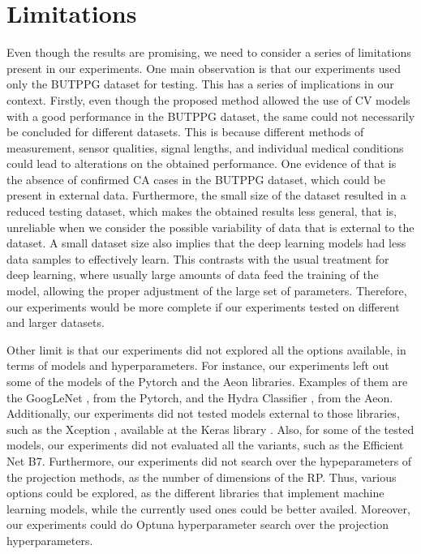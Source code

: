 




\section{Limitations}
\label{sec:Limitations}

Even though the results are promising, we need to consider a series of limitations present in our experiments. One main observation is that our experiments used only the BUTPPG dataset for testing. This has a series of implications in our context. Firstly, even though the proposed method allowed the use of \gls{CV} models with a good performance in the BUTPPG dataset, the same could not necessarily be concluded for different datasets. This is because different methods of measurement, sensor qualities, signal lengths, and individual medical conditions could lead to alterations on the obtained performance. One evidence of that is the absence of confirmed \gls{CA} cases in the \gls{BUTPPG} dataset, which could be present in external data. Furthermore, the small size of the dataset resulted in a reduced testing dataset, which makes the obtained results less general, that is, unreliable when we consider the possible variability of data that is external to the dataset. A small dataset size also implies that the deep learning models had less data samples to effectively learn. This contrasts with the usual treatment for deep learning, where usually large amounts of data feed the training of the model, allowing the proper adjustment of the large set of parameters. Therefore, our experiments would be more complete if our experiments tested on different and larger datasets.

Other limit is that our experiments did not explored all the options available, in terms of models and hyperparameters. For instance, our experiments left out some of the models of the Pytorch and the Aeon libraries. Examples of them are the GoogLeNet \cite{GoogLeNet}, from the Pytorch, and the Hydra Classifier \cite{HydraClassifier}, from the Aeon. Additionally, our experiments did not tested models external to those libraries, such as the Xception \cite{Xception}, available at the Keras library \cite{Keras}. Also, for some of the tested models, our experiments did not evaluated all the variants, such as the Efficient Net B7. Furthermore, our experiments did not search over the hypeparameters of the projection methods, as the number of dimensions of the \gls{RP}. Thus, various options could be explored, as the different libraries that implement machine learning models, while the currently used ones could be better availed. Moreover, our experiments could do Optuna hyperparameter search over the projection hyperparameters.

